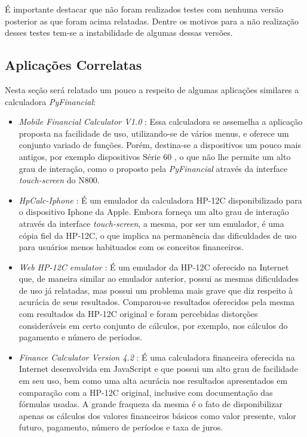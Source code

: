 É importante destacar que não foram realizados testes com nenhuma versão posterior as que foram acima relatadas. Dentre os motivos para a não realização desses testes tem-se a instabilidade de algumas dessas versões.


\subsection{Aplicações Correlatas}


Nesta seção será relatado um pouco a respeito de algumas aplicações similares a calculadora \textit{PyFinancial}:

\begin{itemize}

 \item \textit{Mobile Financial Calculator V1.0} \cite{mobcalc}: Essa calculadora se assemelha a aplicação proposta na facilidade de uso, utilizando-se de vários menus, e oferece um conjunto variado de funções. Porém, destina-se a dispositivos um pouco mais antigos, por exemplo dispositivos Série 60 \cite{s60}, o que não lhe permite um alto grau de interação, como o proposto pela \textit{PyFinancial} através da interface \textit{touch-screen} do N800.

 \item \textit{HpCalc-Iphone} \cite{hpiphone}: É um emulador da calculadora HP-12C disponibilizado para o dispositivo Iphone da Apple. Embora forneça um alto grau de interação através da interface \textit{touch-screen}, a mesma, por ser um emulador, é uma cópia fiel da HP-12C, o que implica na permanência das dificuldades de uso para usuários menos habituados com os conceitos financeiros.

 \item \textit{Web HP-12C emulator} \cite{epxcalc}: É um emulador da HP-12C oferecido na Internet que, de maneira similar ao emulador anterior, possui as mesmas dificuldades de uso já relatadas, mas possui um problema mais grave que diz respeito à acurácia de seus resultados. Comparou-se resultados oferecidos pela mesma com resultados da HP-12C original e foram percebidas distorções consideráveis em certo conjunto de cálculos, por exemplo, nos cálculos do pagamento e número de períodos.

 \item \textit{Finance Calculator Version 4.2} \cite{arachnoid}: É uma calculadora financeira oferecida na Internet desenvolvida em JavaScript e que possui um alto grau de facilidade em seu uso, bem como uma alta acurácia nos resultados apresentados em comparação com a HP-12C original, inclusive com documentação das fórmulas usadas. A grande fraqueza da mesma é o fato de disponibilizar apenas os cálculos dos valores financeiros básicos como valor presente, valor futuro, pagamento, número de períodos e taxa de juros.

\end{itemize}

